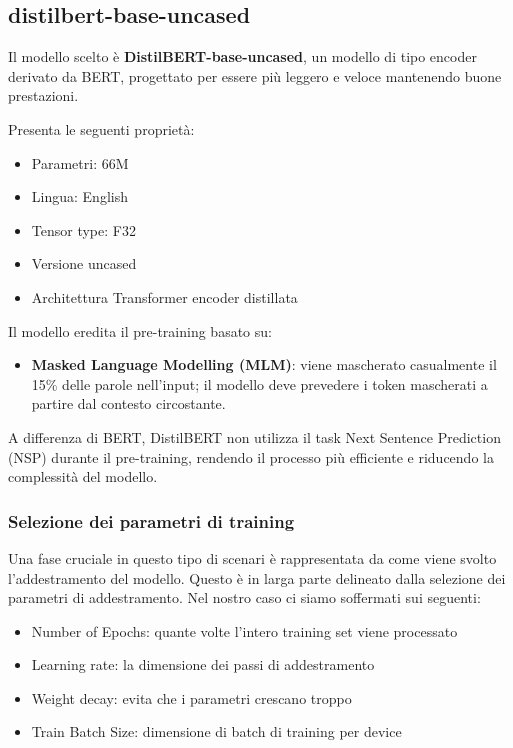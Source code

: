 \documentclass[a4paper,12pt]{article}
\begin{document}
\subsection{distilbert-base-uncased}
Il modello scelto è \textbf{DistilBERT-base-uncased}, un modello di tipo encoder derivato da BERT, progettato per essere più leggero e veloce mantenendo buone prestazioni.

Presenta le seguenti proprietà:

\begin{itemize}
    \item Parametri: 66M
    \item Lingua: English
    \item Tensor type: F32
    \item Versione uncased
    \item Architettura Transformer encoder distillata
\end{itemize}

Il modello eredita il pre-training basato su:

\begin{itemize}
    \item \textbf{Masked Language Modelling (MLM)}: viene mascherato casualmente il 15\% delle parole nell’input; il modello deve prevedere i token mascherati a partire dal contesto circostante.
\end{itemize}

A differenza di BERT, DistilBERT non utilizza il task Next Sentence Prediction (NSP) durante il pre-training, rendendo il processo più efficiente e riducendo la complessità del modello.


\subsubsection{Selezione dei parametri di training}

Una fase cruciale in questo tipo di scenari è rappresentata da come viene svolto l’addestramento del modello. Questo è in larga parte delineato dalla selezione dei parametri di addestramento. Nel nostro caso ci siamo soffermati sui seguenti:

\begin{itemize}
    \item Number of Epochs: quante volte l’intero training set viene processato
    \item Learning rate: la dimensione dei passi di addestramento
    \item Weight decay: evita che i parametri crescano troppo
    \item Train Batch Size: dimensione di batch di training per device
\end{itemize}
\end{document}
